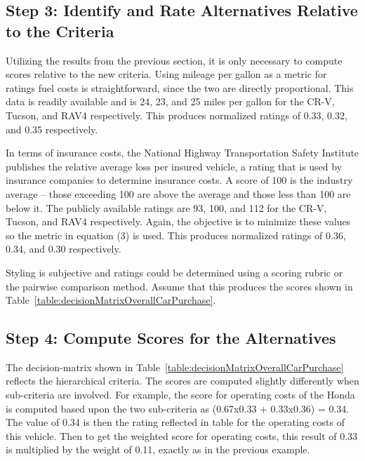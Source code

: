 \subsection*{Step 3: Identify and Rate Alternatives Relative to the Criteria}

Utilizing the results from the previous section, it is only necessary to
compute scores relative to the new criteria. Using mileage per gallon as
a metric for ratings fuel costs is straightforward, since the two are
directly proportional. This data is readily available and is 24, 23, and
25 miles per gallon for the CR-V, Tucson, and RAV4 respectively. This
produces normalized ratings of 0.33, 0.32, and 0.35 respectively.

In terms of insurance costs, the National Highway Transportation Safety
Institute publishes the relative average loss per insured vehicle, a
rating that is used by insurance companies to determine insurance costs.
A score of 100 is the industry average -- those exceeding 100 are above
the average and those less than 100 are below it. The publicly available
ratings are 93, 100, and 112 for the CR-V, Tucson, and RAV4
respectively. Again, the objective is to minimize these values so the
metric in equation (3) is used. This produces normalized ratings of
0.36, 0.34, and 0.30 respectively.

Styling is subjective and ratings could be determined using a scoring
rubric or the pairwise comparison method. Assume that this produces the
scores shown in Table~\ref{table:decisionMatrixOverallCarPurchase}.

\subsection*{Step 4: Compute Scores for the Alternatives}

The decision-matrix shown in Table~\ref{table:decisionMatrixOverallCarPurchase} reflects the hierarchical
criteria. The scores are computed slightly differently when sub-criteria
are involved. For example, the score for operating costs of the Honda is
computed based upon the two sub-criteria as (0.67x0.33 + 0.33x0.36) =
0.34. The value of 0.34 is then the rating reflected in table for the
operating costs of this vehicle. Then to get the weighted score for
operating costs, this result of 0.33 is multiplied by the weight of
0.11, exactly as in the previous example.


